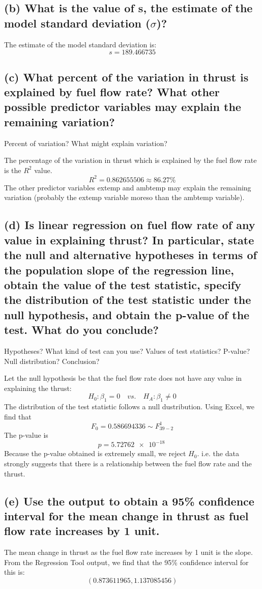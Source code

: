 \documentclass[letterpaper]{article}
\begin{document}
\subsection{(b)	What is the value of s, the estimate of the model standard deviation ($\sigma$)?}
The estimate of the model standard deviation is:
$$s = 189.466735$$

\subsection{(c)	What percent of the variation in  thrust is explained by fuel flow rate? What other possible predictor variables may explain the remaining variation?}
Percent of variation? What might explain variation?

The percentage of the variation in thrust which is explained by the fuel flow rate
is the $R^2$ value.
$$R^2 = 0.862655506 \approx 86.27\%$$
The other predictor variables extemp and ambtemp may explain the remaining variation
(probably the extemp variable moreso than the ambtemp variable).

\subsection{(d)	Is linear regression on fuel flow rate of any value in explaining thrust? In particular, state the
 null and alternative hypotheses in terms of the population slope of the regression line, obtain the value of the test statistic, specify the distribution of the test statistic under the null hypothesis, and obtain the p-value of the test. What do you conclude?}
Hypotheses? What kind of test can you use? Values of test
statistics? P-value? Null distribution? Conclusion?

Let the null hypothesis be that the fuel flow rate does not have any value in explaining the thrust:
$$ H_0: \beta_1 =0 \quad vs. \quad H_A: \beta_1 \neq 0 $$
The distribution of the test statistic follows a null dustribution.
Using Excel, we find that
$$F_0 = 0.586694336 \sim F_{39-2}^{1}$$
The p-value is
$$p= \SI{5.72762e-18}{} $$
Because the p-value obtained is extremely small, we reject $H_0$. i.e. the data strongly suggests that there is a relationship between the fuel flow rate and the thrust.

\subsection{(e)	Use the output to obtain a 95\% confidence interval for the mean change in thrust as fuel flow rate increases by 1 unit.}
The mean change in thrust as the fuel flow rate increases by 1 unit is the slope.
From the Regression Tool output, we find that the 95\% confidence interval
for this is:
$$(0.873611965, 1.137085456)$$
\end{document}
